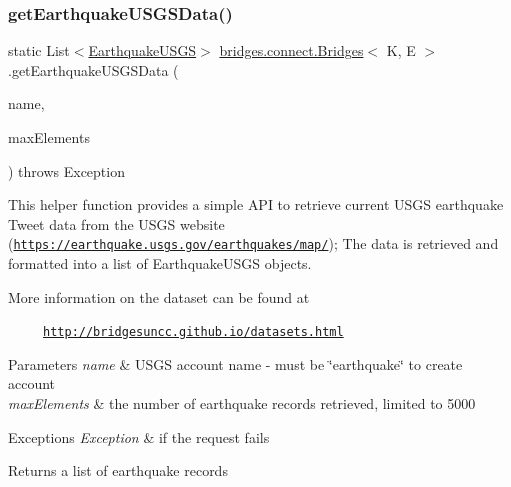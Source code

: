 \subsubsection{\texorpdfstring{get\+Earthquake\+U\+S\+G\+S\+Data()}{getEarthquakeUSGSData()}}
{\footnotesize\ttfamily static List$<$\hyperlink{classbridges_1_1data__src__dependent_1_1_earthquake_u_s_g_s}{Earthquake\+U\+S\+GS}$>$ \hyperlink{classbridges_1_1connect_1_1_bridges}{bridges.\+connect.\+Bridges}$<$ K, E $>$.get\+Earthquake\+U\+S\+G\+S\+Data (\begin{DoxyParamCaption}\item[{\hyperlink{classbridges_1_1data__src__dependent_1_1_u_s_g_saccount}{U\+S\+G\+Saccount}}]{name,  }\item[{int}]{max\+Elements }\end{DoxyParamCaption}) throws Exception\hspace{0.3cm}{\ttfamily [static]}}

This helper function provides a simple A\+PI to retrieve current U\+S\+GS earthquake Tweet data from the U\+S\+GS website (\href{https://earthquake.usgs.gov/earthquakes/map/}{\tt https\+://earthquake.\+usgs.\+gov/earthquakes/map/}); The data is retrieved and formatted into a list of Earthquake\+U\+S\+GS objects.

More information on the dataset can be found at 

~~~~~\href{http://bridgesuncc.github.io/datasets.html}{\tt http\+://bridgesuncc.\+github.\+io/datasets.\+html} 


\begin{DoxyParams}{Parameters}
{\em name} & U\+S\+GS account name -\/ must be \char`\"{}earthquake\char`\"{} to create account \\
\hline
{\em max\+Elements} & the number of earthquake records retrieved, limited to 5000 \\
\hline
\end{DoxyParams}

\begin{DoxyExceptions}{Exceptions}
{\em Exception} & if the request fails\\
\hline
\end{DoxyExceptions}
\begin{DoxyReturn}{Returns}
a list of earthquake records 
\end{DoxyReturn}
\hypertarget{classbridges_1_1connect_1_1_bridges_abcd1c3465d8963cd635a63e248f33525}{}\label{classbridges_1_1connect_1_1_bridges_abcd1c3465d8963cd635a63e248f33525} 
